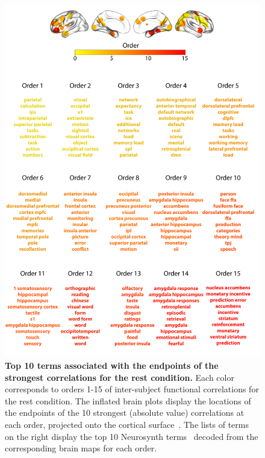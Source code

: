 \documentclass{article}
\begin{document}
\begin{figure}[p!]
\centering
\includegraphics[width=\textwidth]{figs/supp_15_rest}
\caption{\small \textbf{Top 10 terms associated with the endpoints of the
      strongest correlations for the rest condition.}  Each color corresponds to orders 1-15 of
    inter-subject functional correlations for the rest condition. The inflated brain plots
    display the locations of the endpoints of the 10 strongest
    (absolute value) correlations at each order, projected onto the
    cortical surface~\citep{CombEtal19}.  The lists of terms on the
    right display the top 10 Neurosynth terms~\citep{RubiEtal17}
    decoded from the corresponding brain maps for each order.}
\label{fig:rest}
\end{figure}






\newpage
\renewcommand{\refname}{Supplemental references}

\end{document}
